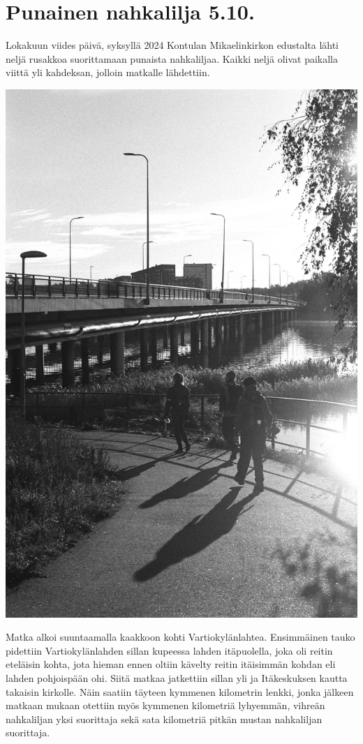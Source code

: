 \section{Punainen nahkalilja 5.10.}

\begin{multicols}{2}
\noindent Lokakuun viides päivä, syksyllä 2024 Kontulan Mikaelinkirkon 
edustalta lähti neljä rusakkoa suorittamaan punaista nahkaliljaa. Kaikki 
neljä olivat paikalla viittä yli kahdeksan, jolloin matkalle lähdettiin. 

\vspace*{0.16cm}
\noindent\includegraphics[width=\linewidth]{assets/nahkaliljapunainen1.jpg}

Matka alkoi suuntaamalla kaakkoon kohti Vartiokylänlahtea. Ensimmäinen tauko 
pidettiin Vartiokylänlahden sillan kupeessa lahden itäpuolella, joka oli 
reitin eteläisin kohta, jota hieman ennen oltiin kävelty reitin itäisimmän 
kohdan eli lahden pohjoispään ohi. Siitä matkaa jatkettiin sillan yli ja 
Itäkeskuksen kautta takaisin kirkolle. Näin saatiin täyteen kymmenen 
kilometrin lenkki, jonka jälkeen matkaan mukaan otettiin myös kymmenen 
kilometriä lyhyemmän, vihreän nahkaliljan yksi suorittaja sekä sata 
kilometriä pitkän mustan nahkaliljan suorittaja. 


\end{multicols}
